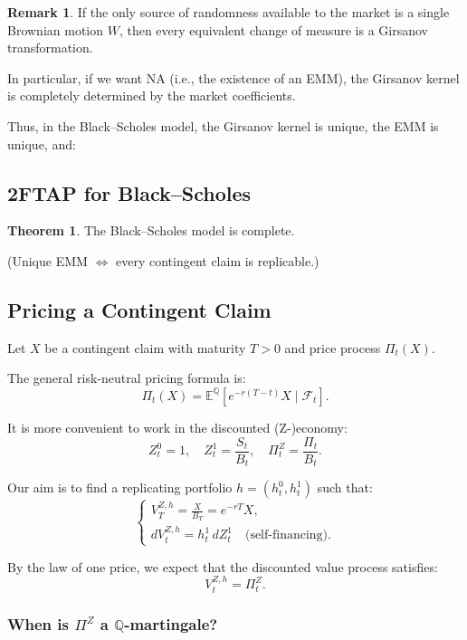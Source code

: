 \documentclass[12pt,a4paper]{article}
\theoremstyle{definition}
\newtheorem{theorem}{Theorem}[section]
\newtheorem{remark}{Remark}[section]
\begin{document}
\begin{remark}
If the only source of randomness available to the market is a single Brownian motion $W$, then every equivalent change of measure is a Girsanov transformation.

In particular, if we want NA (i.e., the existence of an EMM), the Girsanov kernel is completely determined by the market coefficients.

Thus, in the Black--Scholes model, the Girsanov kernel is unique, the EMM is unique, and:
\end{remark}

\subsection{2FTAP for Black--Scholes}

\begin{theorem}
The Black--Scholes model is complete.

(Unique EMM $\iff$ every contingent claim is replicable.)
\end{theorem}

\subsection{Pricing a Contingent Claim}

Let $X$ be a contingent claim with maturity $T > 0$ and price process $\Pi_t(X)$.

The general risk-neutral pricing formula is:
\[
\Pi_t(X) = \mathbb{E}^\mathbb{Q}[e^{-r(T-t)} X \mid \mathcal{F}_t].
\]

It is more convenient to work in the discounted (Z-)economy:
\[
Z_t^0 = 1, \quad Z_t^1 = \frac{S_t}{B_t}, \quad \Pi_t^Z = \frac{\Pi_t}{B_t}.
\]

Our aim is to find a replicating portfolio $h = (h_t^0, h_t^1)$ such that:
\[
\begin{cases}
V_T^{Z,h} = \frac{X}{B_T} = e^{-rT} X, \\
dV_t^{Z,h} = h_t^1 \, dZ_t^1 \quad \text{(self-financing)}.
\end{cases}
\]

By the law of one price, we expect that the discounted value process satisfies:
\[
V_t^{Z,h} = \Pi_t^Z.
\]

\subsubsection{When is $\Pi^Z$ a $\mathbb{Q}$-martingale?}
\end{document}
